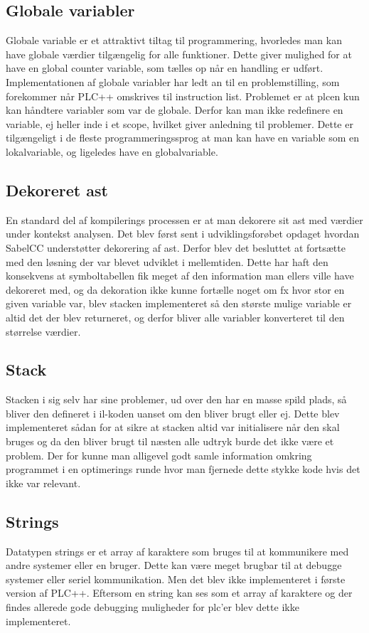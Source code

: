 \subsection*{Globale variabler}
Globale variable er et attraktivt tiltag til programmering, hvorledes man kan have globale værdier tilgængelig for alle funktioner.
Dette giver mulighed for at have en global counter variable, som tælles op når en handling er udført.
Implementationen af globale variabler har ledt an til en problemstilling, som forekommer når PLC++ omskrives til instruction list. Problemet er at \gls{plc}en kun kan håndtere variabler som var de globale.
Derfor kan man ikke redefinere en variable, ej heller inde i et scope, hvilket giver anledning til problemer.
Dette er tilgængeligt i de fleste programmeringssprog at man kan have en variable som en lokalvariable, og ligeledes have en globalvariable.

\subsection*{Dekoreret \gls{ast}}
En standard del af kompilerings processen er at man dekorere sit \gls{ast} med værdier under kontekst analysen. Det blev først sent i udviklingsforøbet opdaget hvordan SabelCC understøtter dekorering af \gls{ast}. Derfor blev det besluttet at fortsætte med den løsning der var blevet udviklet i mellemtiden. Dette har haft den konsekvens at symboltabellen fik meget af den information man ellers ville have dekoreret med, og da dekoration ikke kunne fortælle noget om fx hvor stor en given variable var, blev stacken implementeret så den største mulige variable er altid det der blev returneret, og derfor bliver alle variabler konverteret til den størrelse værdier.

\subsection*{Stack}
Stacken i sig selv har sine problemer, ud over den har en masse spild plads, så bliver den defineret i \gls{il}-koden uanset om den bliver brugt eller ej. Dette blev implementeret sådan for at sikre at stacken altid var initialisere når den skal bruges og da den bliver brugt til næsten alle udtryk burde det ikke være et problem. Der for kunne man alligevel godt samle information omkring programmet i en optimerings runde hvor man fjernede dette stykke kode hvis det ikke var relevant.

\subsection*{Strings}
Datatypen strings er et array af karaktere som bruges til at kommunikere med andre systemer eller en bruger. Dette kan være meget brugbar til at debugge systemer eller seriel kommunikation. Men det blev ikke implementeret i første version af PLC++. Eftersom en string kan ses som et array af karaktere og der findes allerede gode debugging muligheder for \gls{plc}'er blev dette ikke implementeret.

